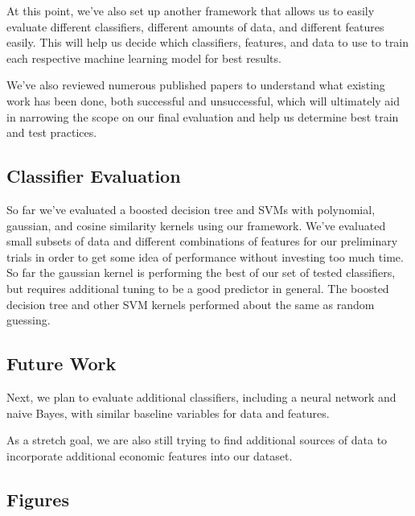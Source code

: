 \documentclass{article}
\begin{document}
At this point, we've also set up another framework that allows us to easily evaluate different classifiers, different amounts of data, and different features easily. This will help us decide which classifiers, features, and data to use to train each respective machine learning model for best results.

We've also reviewed numerous published papers to understand what existing work has been done, both successful and unsuccessful, which will ultimately aid in narrowing the scope on our final evaluation and help us determine best train and test practices.

\subsection{Classifier Evaluation}

So far we've evaluated a boosted decision tree and SVMs with polynomial, gaussian, and cosine similarity kernels using our framework. We've evaluated small subsets of data and different combinations of features for our preliminary trials in order to get some idea of performance without investing too much time. So far the gaussian kernel is performing the best of our set of tested classifiers, but requires additional tuning to be a good predictor in general. The boosted decision tree and other SVM kernels performed about the same as random guessing.

\subsection{Future Work}

Next, we plan to evaluate additional classifiers, including a neural network and naive Bayes, with similar baseline variables for data and features.

As a stretch goal, we are also still trying to find additional sources of data to incorporate additional economic features into our dataset.

\subsection{Figures}
\end{document}
